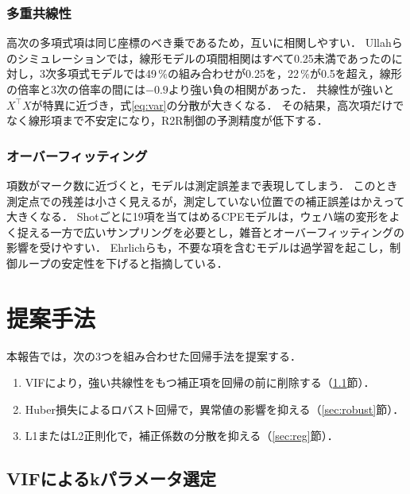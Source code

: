 \documentclass[11pt,a4paper]{ltjsarticle}
\begin{document}
\subsubsection{多重共線性}

高次の多項式項は同じ座標のべき乗であるため，互いに相関しやすい．
Ullahらのシミュレーションでは，線形モデルの項間相関はすべて0.25未満であったのに対し，3次多項式モデルでは49\,\%の組み合わせが0.25を，22\,\%が0.5を超え，線形の倍率と3次の倍率の間には$-0.9$より強い負の相関があった\cite{Ullah2013}．
共線性が強いと$X^\top X$が特異に近づき，式\eqref{eq:var}の分散が大きくなる．
その結果，高次項だけでなく線形項まで不安定になり，R2R制御の予測精度が低下する\cite{Ullah2013,Ju2016}．

\subsubsection{オーバーフィッティング}

項数がマーク数に近づくと，モデルは測定誤差まで表現してしまう．
このとき測定点での残差は小さく見えるが，測定していない位置での補正誤差はかえって大きくなる．
Shotごとに19項を当てはめるCPEモデルは，ウェハ端の変形をよく捉える一方で広いサンプリングを必要とし，雑音とオーバーフィッティングの影響を受けやすい\cite{Lee2017}．
Ehrlichらも，不要な項を含むモデルは過学習を起こし，制御ループの安定性を下げると指摘している\cite{Ehrlich2025}．

\section{提案手法}

本報告では，次の3つを組み合わせた回帰手法を提案する．
\begin{enumerate}
  \item VIFにより，強い共線性をもつ補正項を回帰の前に削除する（\ref{sec:vif}節）．
  \item Huber損失によるロバスト回帰で，異常値の影響を抑える（\ref{sec:robust}節）．
  \item L1またはL2正則化で，補正係数の分散を抑える（\ref{sec:reg}節）．
\end{enumerate}

\subsection{VIFによるkパラメータ選定}\label{sec:vif}
\end{document}
